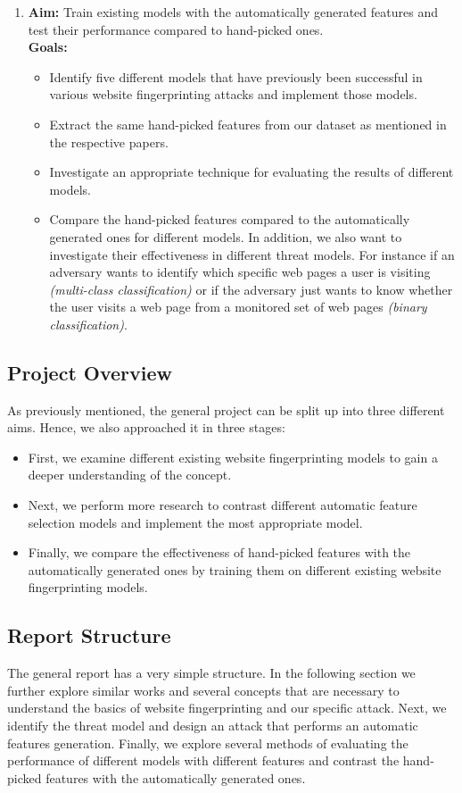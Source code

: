 \begin{enumerate}
   \item \textbf{Aim:} Train existing models with the automatically generated features and test their performance compared to hand-picked ones.\\
   \textbf{Goals:}
   \begin{itemize}
      \item Identify five different models that have previously been successful in various website fingerprinting attacks and implement those models.
      \item Extract the same hand-picked features from our dataset as mentioned in the respective papers.
      \item Investigate an appropriate technique for evaluating the results of different models.
      \item Compare the hand-picked features compared to the automatically generated ones for different models. In addition, we also want to investigate
         their effectiveness in different threat models. For instance if an adversary wants to identify which specific web pages a user is visiting \textit{(multi-class classification)} or
         if the adversary just wants to know whether the user visits a web page from a monitored set of web pages \textit{(binary classification)}.
   \end{itemize}

\end{enumerate}

\newpage

\subsection{Project Overview}
As previously mentioned, the general project can be split up into three different aims. Hence, we also approached it in three stages:

\begin{itemize}
\item First, we examine different existing website fingerprinting models to gain a deeper understanding of the concept.
\item Next, we perform more research to contrast different automatic feature selection models and implement the most appropriate model.
\item Finally, we compare the effectiveness of hand-picked features with the automatically generated ones by training them on different existing website fingerprinting models.
\end{itemize}


\subsection{Report Structure}
The general report has a very simple structure.
In the following section we further explore similar works and several concepts that are necessary to understand the basics of website fingerprinting and our specific attack.
Next, we identify the threat model and design an attack that performs an automatic features generation.
Finally, we explore several methods of evaluating the performance of different models with different features and contrast the hand-picked
features with the automatically generated ones.
